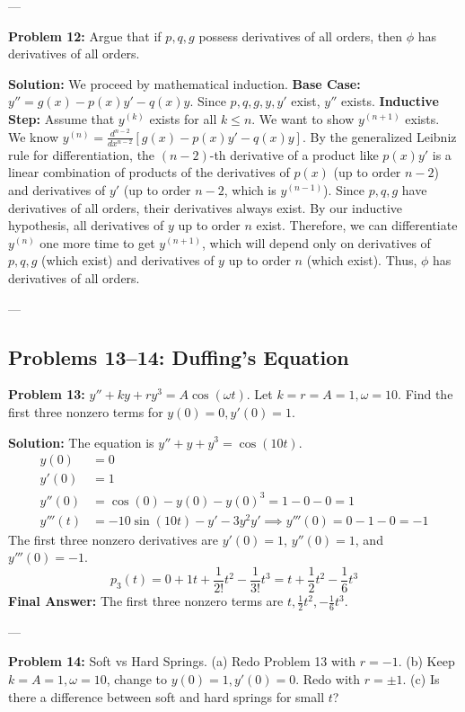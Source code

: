 \documentclass[11pt, letterpaper]{article}
\theoremstyle{definition}
\theoremstyle{remark}
\begin{document}
---

\textbf{Problem 12:} Argue that if $p, q, g$ possess derivatives of all orders, then $\phi$ has derivatives of all orders.

\textbf{Solution:}
We proceed by mathematical induction. 
\textbf{Base Case:} $y'' = g(x) - p(x)y' - q(x)y$. Since $p, q, g, y, y'$ exist, $y''$ exists.
\textbf{Inductive Step:} Assume that $y^{(k)}$ exists for all $k \le n$. We want to show $y^{(n+1)}$ exists.
We know $y^{(n)} = \frac{d^{n-2}}{dx^{n-2}} [g(x) - p(x)y' - q(x)y]$.
By the generalized Leibniz rule for differentiation, the $(n-2)$-th derivative of a product like $p(x)y'$ is a linear combination of products of the derivatives of $p(x)$ (up to order $n-2$) and derivatives of $y'$ (up to order $n-2$, which is $y^{(n-1)}$).
Since $p, q, g$ have derivatives of all orders, their derivatives always exist. By our inductive hypothesis, all derivatives of $y$ up to order $n$ exist. Therefore, we can differentiate $y^{(n)}$ one more time to get $y^{(n+1)}$, which will depend only on derivatives of $p, q, g$ (which exist) and derivatives of $y$ up to order $n$ (which exist). Thus, $\phi$ has derivatives of all orders.

---

\subsection{Problems 13--14: Duffing's Equation}

\textbf{Problem 13:} $y'' + ky + ry^3 = A\cos(\omega t)$. Let $k=r=A=1, \omega=10$. Find the first three nonzero terms for $y(0)=0, y'(0)=1$.

\textbf{Solution:}
The equation is $y'' + y + y^3 = \cos(10t)$.
\begin{align*}
    y(0) &= 0 \\
    y'(0) &= 1 \\
    y''(0) &= \cos(0) - y(0) - y(0)^3 = 1 - 0 - 0 = 1 \\
    y'''(t) &= -10\sin(10t) - y' - 3y^2 y' \implies y'''(0) = 0 - 1 - 0 = -1
\end{align*}
The first three nonzero derivatives are $y'(0)=1$, $y''(0)=1$, and $y'''(0)=-1$.
\[ p_3(t) = 0 + 1t + \frac{1}{2!}t^2 - \frac{1}{3!}t^3 = t + \frac{1}{2}t^2 - \frac{1}{6}t^3 \]
\textbf{Final Answer:} The first three nonzero terms are $t, \frac{1}{2}t^2, -\frac{1}{6}t^3$.

---

\textbf{Problem 14:} Soft vs Hard Springs.
(a) Redo Problem 13 with $r = -1$.
(b) Keep $k=A=1, \omega=10$, change to $y(0)=1, y'(0)=0$. Redo with $r = \pm 1$.
(c) Is there a difference between soft and hard springs for small $t$?
\end{document}
